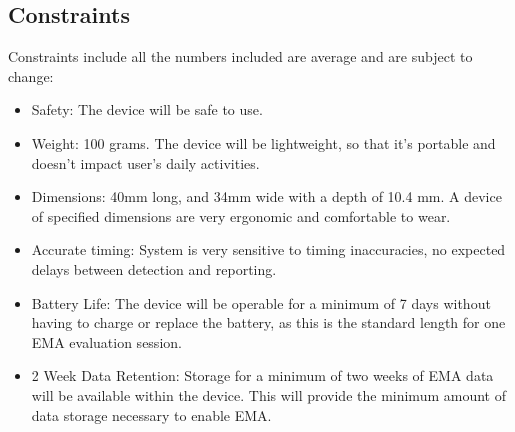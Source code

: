 \documentclass[12pt]{article}
\begin{document}
\subsection{Constraints}
Constraints include all the numbers included are average and are subject to change:
\begin{itemize}
    \item Safety: The device will be safe to use.
    \item Weight: 100 grams. The device will be lightweight, so that it's portable and doesn't impact user's daily activities.
    \item Dimensions: 40mm long, and 34mm wide with a depth of 10.4 mm. A device of specified dimensions are very ergonomic and comfortable to wear.
    \item Accurate timing: System is very sensitive to timing inaccuracies, no \linebreak expected delays between detection and reporting.
    \item Battery Life: The device will be operable for a minimum of 7 days without having to charge or replace the battery, as this is the standard length for one EMA evaluation session.
    \item 2 Week Data Retention: Storage for a minimum of two weeks of EMA data will be available within the device. This will provide the minimum amount of data storage necessary to enable EMA.
\end{itemize}

\pagebreak
\end{document}
